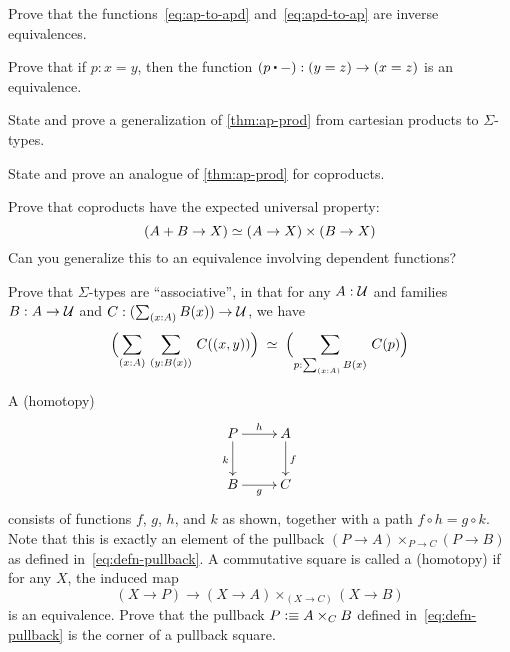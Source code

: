 \begin{ex}
  Prove that the functions~\eqref{eq:ap-to-apd} and~\eqref{eq:apd-to-ap} are inverse equivalences.
\end{ex}

\begin{ex}\label{ex:equiv-concat}
  Prove that if $p:x=y$, then the function $(p\ct {-}):(y=z) \to (x=z)$ is an equivalence.
\end{ex}

\begin{ex}\label{ex:ap-sigma}
  State and prove a generalization of \autoref{thm:ap-prod} from cartesian products to $\Sigma$-types.
\end{ex}

\begin{ex}
  State and prove an analogue of \autoref{thm:ap-prod} for coproducts.
\end{ex}

\begin{ex}\label{ex:coprod-ump}
  Prove that coproducts have the expected universal property:
  \[ (A+B \to X) \simeq (A\to X)\times (B\to X) \]
  Can you generalize this to an equivalence involving dependent functions?
\end{ex}

\begin{ex}\label{ex:sigma-assoc}
  Prove that $\Sigma$-types are ``associative'',
  in that for any $A:\mathcal{U}$ and families $B:A\to\mathcal{U}$ and $C:(\sm{x:A} B(x))\to\UU$, we have
  \[\eqvspaced{\Parens{\sm{x:A}{y:B(x)} C(\pairr{x,y})}}{\Parens{\sm{p:\sm{x:A}B(x)} C(p)}} \]
\end{ex}

\begin{ex}\label{ex:pullback}
  A (homotopy) 
  \begin{equation*}
  \vcenter{\xymatrix{
      P\ar[r]^h\ar[d]_k &
      A\ar[d]^f\\
      B\ar[r]_g &
      C
      }}
  \end{equation*}
  consists of functions $f$, $g$, $h$, and $k$ as shown, together with a path $f \circ h= g \circ k$.
  Note that this is exactly an element of the pullback $(P\to A) \times_{P\to C} (P\to B)$ as defined in~\eqref{eq:defn-pullback}.
  A commutative square is called a (homotopy) 
  if for any $X$, the induced map
  \[ (X\to P) \to (X\to A) \times_{(X\to C)} (X\to B) \]
  is an equivalence.
  Prove that the pullback $P \vcentcolon\equiv A\times_C B$ defined in~\eqref{eq:defn-pullback} is the corner of a pullback square.
\end{ex}

